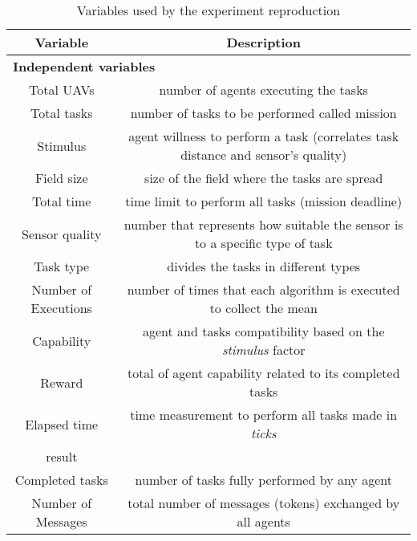 \begin{table}%
	\small
	\fontsize{6}{6}\selectfont
	\centering
	\caption{Variables used by the experiment reproduction}
	\label{table:variables}
	
	\begin{tabular}{cc}
	\hline
		Variable
		& Description\\ [1ex]
	\hline	
	\multicolumn{2}{l}{\textbf{Independent variables}} \\
	\hline
	Total UAVs           & number of agents executing the tasks \\[1ex]
	Total tasks          & number of tasks to be performed called mission \\[1ex]
	Stimulus                 & agent willness to perform a task (correlates task distance and sensor's quality)\\[1ex]
	Field size               & size of the field where the tasks are spread \\[1ex]
	Total time               & time limit to perform all tasks (mission deadline)\\[1ex]
	Sensor quality           & number that represents how suitable the sensor is to a specific type of task\\[1ex]
	Task type                & divides the tasks in different types\\[1ex]
	Number of Executions     & number of times that each algorithm is executed to collect the mean \multicolumn{2}{l}{\textbf{Dependent variables}} \\
	\hline
	Capability               & agent and tasks compatibility based on the \textit{stimulus} factor \\[1ex]
	Reward                   & total of agent capability related to its completed tasks \\[1ex]
	Elapsed time             & time measurement to perform all tasks made in \textit{ticks}\\[1ex]
	result\\[1ex]
	Completed tasks          & number of tasks fully performed by any agent\\[1ex]
	Number of Messages       & total number of messages (tokens) exchanged by all agents
	\hline
	\end{tabular}
\end{table} 
